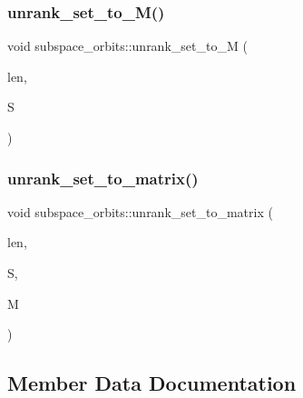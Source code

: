 \subsubsection{\texorpdfstring{unrank\+\_\+set\+\_\+to\+\_\+\+M()}{unrank\_set\_to\_M()}}
{\footnotesize\ttfamily void subspace\+\_\+orbits\+::unrank\+\_\+set\+\_\+to\+\_\+M (\begin{DoxyParamCaption}\item[{\mbox{\hyperlink{galois_8h_a09fddde158a3a20bd2dcadb609de11dc}{I\+NT}}}]{len,  }\item[{\mbox{\hyperlink{galois_8h_a09fddde158a3a20bd2dcadb609de11dc}{I\+NT}} $\ast$}]{S }\end{DoxyParamCaption})}

\mbox{\label{classsubspace__orbits_aaa0e34dafb23d81af5275348122ada17}} 
\subsubsection{\texorpdfstring{unrank\+\_\+set\+\_\+to\+\_\+matrix()}{unrank\_set\_to\_matrix()}}
{\footnotesize\ttfamily void subspace\+\_\+orbits\+::unrank\+\_\+set\+\_\+to\+\_\+matrix (\begin{DoxyParamCaption}\item[{\mbox{\hyperlink{galois_8h_a09fddde158a3a20bd2dcadb609de11dc}{I\+NT}}}]{len,  }\item[{\mbox{\hyperlink{galois_8h_a09fddde158a3a20bd2dcadb609de11dc}{I\+NT}} $\ast$}]{S,  }\item[{\mbox{\hyperlink{galois_8h_a09fddde158a3a20bd2dcadb609de11dc}{I\+NT}} $\ast$}]{M }\end{DoxyParamCaption})}



\subsection{Member Data Documentation}
\mbox{\label{classsubspace__orbits_a64e1c9019d8dcf39f16528038aebb31a}} 
